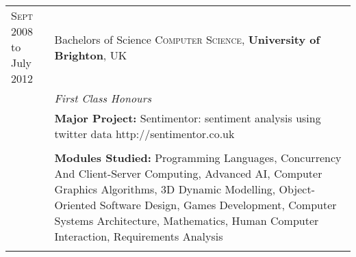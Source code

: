 \documentclass[a4paper,10pt]{article} %
\begin{document}
\begin{tabular}{ L{2cm} | L{11cm}}	
\textsc{Sept} 2008 to July 2012  & Bachelors of Science \textsc{Computer Science}, \textbf{University of Brighton}, UK\\
& \small\emph{First Class Honours} \\
& \small\textbf{Major Project:} Sentimentor: sentiment analysis using twitter data http://sentimentor.co.uk \\
&\normalsize \\
& \small\textbf{Modules Studied:} Programming Languages, Concurrency And Client-Server Computing, Advanced AI, Computer Graphics Algorithms, 3D Dynamic Modelling, Object-Oriented Software Design, Games Development, Computer Systems Architecture, Mathematics, Human Computer Interaction, Requirements Analysis  \\
&\\


%
%
%
%

\end{tabular}

%
%
%
\end{document}
